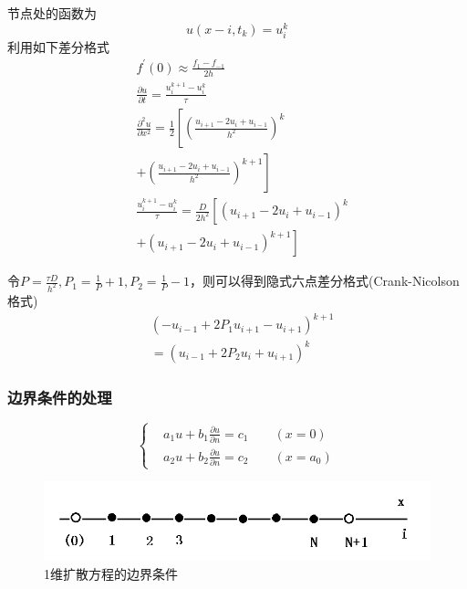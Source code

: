 \documentclass[twoside,twocolumn]{article}
\begin{document}
\begin{CJK*}{UTF8}{gkai}
节点处的函数为
\begin{equation*}
u(x-{i},t_{k})=u_{i}^{k}
\end{equation*}
利用如下差分格式
\begin{equation*}
\begin{aligned}
&f^{\prime}(0)\approx \frac{f_{1}-f_{-1}}{2h}\\
&\frac{\partial u}{\partial t}=\frac{u_{i}^{k+1}-u_{i}^{k}}{\tau}\\
&\frac{\partial^{2}u}{\partial x^{2}}=\frac{1}{2}\left[\left(\frac{u_{i+1}-2u_{i}+u_{i-1}}{h^{2}}\right)^{k}\right.\\
&\left.+\left(\frac{u_{i+1}-2u_{i}+u_{i-1}}{h^{2}}\right)^{k+1}\right]\\
&\frac{u_{i}^{k+1}-u_{i}^{k}}{\tau}=\frac{D}{2h^{2}}\left[\left(u_{i+1}-2u_{i}+u_{i-1}\right)^{k}\right.\\
&\left.+\left(u_{i+1}-2u_{i}+u_{i-1}\right)^{k+1}\right]
\end{aligned}
\end{equation*}

令$P=\frac{\tau D}{h^{2}},P_{1}=\frac{1}{P}+1,P_{2}=\frac{1}{P}-1$，则可以得到隐式六点差分格式(Crank-Nicolson格式)
\begin{equation*}
\begin{aligned}
&\left(-u_{i-1}+2P_{1}u_{i+1}-u_{i+1}\right)^{k+1}\\
&=\left(u_{i-1}+2P_{2}u_{i}+u_{i+1}\right)^{k}
\end{aligned}
\end{equation*}
\subsubsection{边界条件的处理}
\begin{equation*}
\left\{
\begin{aligned}
&a_{1}u+b_{1}\frac{\partial u}{\partial n}=c_{1}\qquad (x=0)\\
&a_{2}u+b_{2}\frac{\partial u}{\partial n}=c_{2}\qquad (x=a_{0})
\end{aligned}
\right.
\end{equation*}
\begin{figure}[h]
\centering
\includegraphics[width=1.0\linewidth]{figure/fig2}
\caption{1维扩散方程的边界条件}
\label{fig:fig2}
\end{figure}


\end{CJK*}
\end{document}
